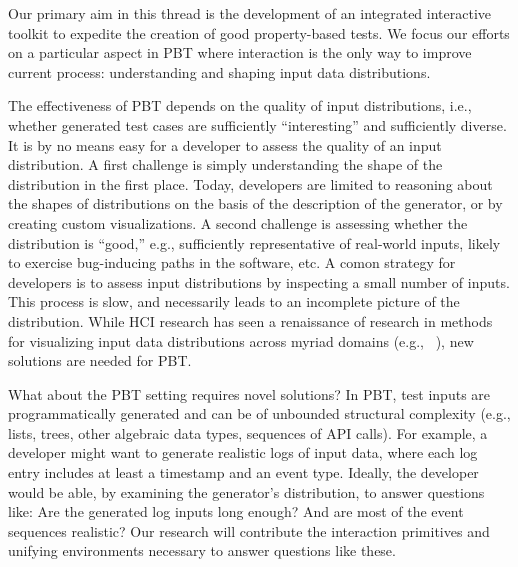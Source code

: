 %
Our primary aim in this thread is the development of an integrated interactive toolkit to expedite the creation of good property-based tests. We focus our efforts on a particular aspect in PBT where interaction is the only way to improve current process: understanding and shaping input data distributions.

The effectiveness of PBT depends on the quality of input distributions, i.e., whether generated test cases are sufficiently ``interesting'' and sufficiently diverse.
It is by no means easy for a developer to assess the quality of
an input distribution. A first challenge is simply understanding the shape of the distribution in the first place. Today, developers are limited to reasoning about the shapes of distributions on the basis of the description of the generator, or by creating custom visualizations. A second challenge is assessing whether the distribution is ``good,'' e.g., sufficiently representative of real-world inputs, likely to exercise bug-inducing paths in the software, etc.
A comon strategy for developers is to assess input distributions by inspecting a
small number of inputs. This process is slow, and necessarily leads to an incomplete picture of the distribution.
While HCI research has seen a renaissance of research in methods for visualizing input data distributions across myriad domains (e.g.,
~\cite{ref:hohman2019gamut,ref:hohman2020understanding,ref:kang2017omnicode}), new solutions are needed for PBT.

What about the PBT setting requires novel solutions?
In PBT, test inputs are
programmatically generated and
can be of unbounded structural
complexity (e.g., lists, trees, other algebraic data types,
sequences of API calls).
For example, a developer might want to generate
realistic logs of input data, where each log entry includes at least a timestamp
and an event type.
%
Ideally, the developer would be able, by examining the generator's
distribution, to answer
questions like: Are the generated log inputs long enough? And are most
of the event sequences realistic?
Our research will contribute the interaction primitives and
 unifying environments necessary to answer questions like these.

